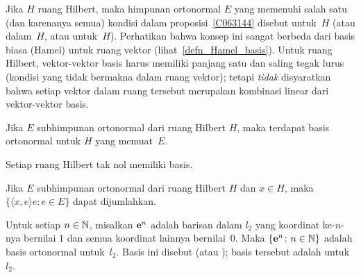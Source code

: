 \begin{defn}\label{C063147} Jika $H$ ruang Hilbert, maka himpunan ortonormal $E$ yang memenuhi
salah satu (dan karenanya semua) kondisi dalam proposisi~\ref{C063144} disebut
 untuk~$H$ (atau
 dalam~$H$, atau
 untuk~$H$). Perhatikan bahwa konsep ini sangat berbeda dari
basis biasa (Hamel) untuk ruang vektor (lihat~\ref{defn_Hamel_basis}). Untuk ruang Hilbert,
vektor-vektor basis harus memiliki panjang satu dan saling tegak lurus
(kondisi yang tidak bermakna dalam ruang vektor); tetapi \emph{tidak} disyaratkan bahwa
setiap vektor dalam ruang tersebut merupakan kombinasi linear dari vektor-vektor basis.
\end{defn}

\begin{prop} Jika $E$ subhimpunan ortonormal dari ruang Hilbert $H$, maka terdapat
basis ortonormal untuk $H$ yang memuat~$E$.
\end{prop}

\begin{cor} Setiap ruang Hilbert tak nol memiliki basis.
\end{cor}

\begin{prop} Jika $E$ subhimpunan ortonormal dari ruang Hilbert $H$ dan $x \in H$, maka
$\{\langle x,e \rangle e: e \in E\}$ dapat dijumlahkan.
\end{prop}

\begin{exam}\label{C063149} Untuk setiap $n \in \mathbb{N}$, misalkan $\mathbf{e}^n$ adalah barisan dalam $l_2$ yang
koordinat ke-$n$-nya bernilai $1$ dan semua koordinat lainnya bernilai~$0$. Maka $\{\mathbf{e}^n\colon n \in \mathbb{N}\}$
adalah basis ortonormal untuk~$l_2$. Basis ini disebut
 (atau
); basis tersebut adalah  untuk~$l_2$.
\end{exam}

